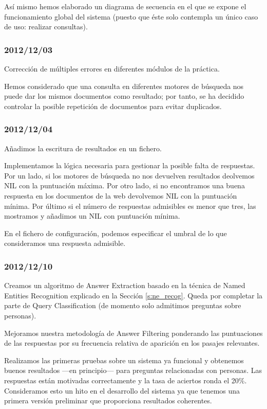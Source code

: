 \documentclass[12pt,a4paper,titlepage]{article}
\begin{document}
Así mismo hemos elaborado un diagrama de secuencia en el que se expone el funcionamiento global del sistema (puesto que éste solo contempla un único caso de uso: realizar consultas).

\subsubsection*{2012/12/03}
Corrección de múltiples errores en diferentes módulos de la práctica.

Hemos considerado que una consulta en diferentes motores de búsqueda nos puede dar los mismos documentos como resultado; por tanto, se ha decidido controlar la posible repetición de documentos para evitar duplicados.

\subsubsection*{2012/12/04}
Añadimos la escritura de resultados en un fichero.

Implementamos la lógica necesaria para gestionar la posible falta de respuestas. Por un lado, si los motores de búsqueda no nos devuelven resultados deolvemos NIL con la puntuación máxima. Por otro lado, si no encontramos una buena respuesta en los documentos de la web devolvemos NIL con la puntuación mínima. Por último si el número de respuestas admisibles es menor que tres, las mostramos y añadimos un NIL con puntuación mínima.

En el fichero de configuración, podemos especificar el umbral de lo que consideramos una respuesta admisible.

\subsubsection*{2012/12/10}
Creamos un algoritmo de Answer Extraction basado en la técnica de Named Entities Recognition explicado en la Sección \ref{s:ne_recog}. Queda por completar la parte de Query Classification (de momento solo admitimos preguntas sobre personas).

Mejoramos nuestra metodología de Answer Filtering ponderando las puntuaciones de las respuestas por su frecuencia relativa de aparición en los pasajes relevantes.

Realizamos las primeras pruebas sobre un sistema ya funcional y obtenemos buenos resultados ---en principio--- para preguntas relacionadas con personas. Las respuestas están motivadas correctamente y la tasa de aciertos ronda el 20\%. Consideramos esto un hito en el desarrollo del sistema ya que tenemos una primera versión preliminar que proporciona resultados coherentes.
\end{document}
